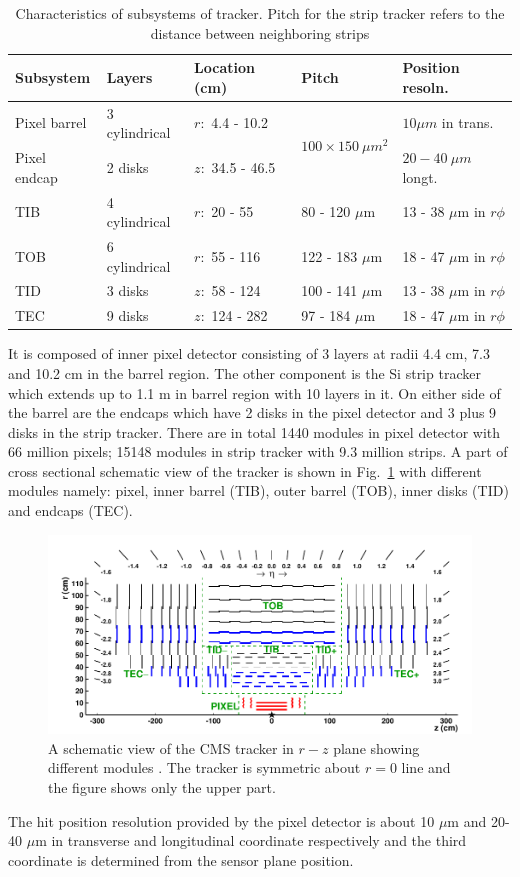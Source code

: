 \begin{table}[h!]
\centering
\caption[Characteristics of tracker]{Characteristics of subsystems of tracker. Pitch for the strip tracker refers to the distance between neighboring strips}
\label{tab:tracker}
\begin{tabular}{lllll}
\hline
Subsystem	&	Layers	&	Location (cm)	&	Pitch	&		Position resoln.\\\hline
Pixel barrel&	3 cylindrical	&	$r:$ 4.4 - 10.2 &	\multirow{2}{*}{$100\times150\ \mu m^2$}	&	$10\mu m$ in trans.\\
Pixel endcap&	2 disks	&		$z:$ 34.5 - 46.5	&		&	 $20-40\ \mu m$ longt.\\\hline
TIB			&	4 cylindrical & $r:$ 20 - 55 &	80 - 120 $\mu$m &	13 - 38 $\mu$m in $r\phi$\\\hline
TOB			&	6 cylindrical &	$r:$ 55 - 116&	122 - 183 $\mu$m &	18 - 47 $\mu$m in $r\phi$\\\hline
TID			&	3 disks		  &	$z:$ 58 - 124&	100 - 141 $\mu$m &	13 - 38 $\mu$m in $r\phi$\\\hline
TEC			&	9 disks		  &	$z:$ 124 - 282&	97 - 184 $\mu$m &	18 - 47 $\mu$m in $r\phi$\\\hline
\end{tabular}
\end{table}

It is composed of inner pixel detector consisting of 3 layers at radii 4.4 cm, 7.3 and 10.2 cm in the barrel region. The other component 
is the Si strip tracker which extends up to 1.1 m in barrel region with 10 layers in it. On either side of the barrel are the endcaps 
which have 2 disks in the pixel detector and 3 plus 9 disks in the strip tracker. There are in total 1440 modules in pixel detector with 
66 million pixels; 15148 modules in strip tracker with 9.3 million strips. A part of cross sectional schematic view of the tracker 
\cite{Chatrchyan:2014fea} is shown in Fig.~\ref{fig:Tracker} with different modules namely: pixel, inner barrel (TIB), outer barrel (TOB), 
inner disks (TID) and endcaps (TEC). 
\begin{figure}[h!]
\centering
\includegraphics[width=0.95\linewidth]{../Figures/Chap2/Tracker}
\caption[CMS tracker]{A schematic view of the CMS tracker in $r-z$ plane showing different modules \cite{Chatrchyan:2014fea}. The tracker is symmetric about $r=0$ line and the figure shows only the upper part.}
\label{fig:Tracker}
\end{figure}
The hit position resolution provided by the pixel detector is about 10 $\mu$m and 20-40 $\mu$m in transverse and longitudinal coordinate respectively and the third coordinate is determined from the sensor plane position.

